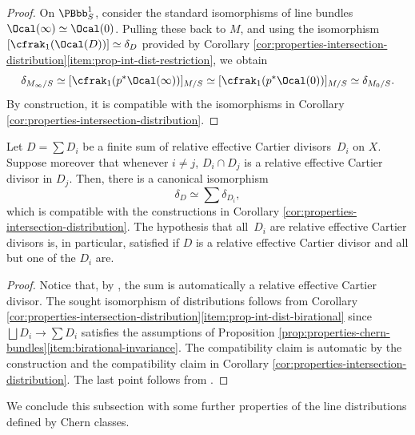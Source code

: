 \begin{proof}
On $\PBbb^{1}_{S}$, consider the standard isomorphisms of line bundles $\Ocal(\infty)\simeq\Ocal(0)$. Pulling these back to $M$, and using the isomorphism $[\cfrak_{1}(\Ocal(D))]\simeq\delta_{D}$ provided by Corollary \ref{cor:properties-intersection-distribution}\eqref{item:prop-int-dist-restriction}, we obtain
\begin{displaymath}
\delta_{M_\infty/S}\simeq [\cfrak_{1}(p^\ast \Ocal(\infty))]_{M/S} \simeq [\cfrak_{1}(p^\ast \Ocal(0))]_{M/S} \simeq \delta_{M_0/S}.
\end{displaymath}
By construction, it is compatible with the isomorphisms in Corollary \ref{cor:properties-intersection-distribution}.
\end{proof}

\begin{corollary}
Let $D = \sum D_i$ be a finite sum of relative effective Cartier divisors~$D_i$ on $X$. Suppose moreover that whenever $i\neq j$, $D_i \cap D_j$ is a relative effective Cartier divisor in $D_j$. Then, there is a canonical isomorphism
\begin{displaymath}
\delta_{D}\simeq \sum \delta_{D_i},
\end{displaymath}
which is compatible with the constructions in Corollary \ref{cor:properties-intersection-distribution}. The hypothesis that all~$D_i$ are relative effective Cartier divisors is, in particular, satisfied if $D$ is a relative effective Cartier divisor and all but one of the $D_i$ are.
\end{corollary}
\begin{proof}
Notice that, by \cite[\href{https://stacks.math.columbia.edu/tag/0B8V}{0B8U}]{stacks-project}, the sum is automatically a relative effective Cartier divisor. The sought isomorphism of distributions follows from Corollary \ref{cor:properties-intersection-distribution}\eqref{item:prop-int-dist-birational} since $\bigsqcup D_i \to \sum D_i$ satisfies the assumptions of Proposition \ref{prop:properties-chern-bundles}\eqref{item:birational-invariance}. The compatibility claim is automatic by the construction and the compatibility claim in Corollary \ref{cor:properties-intersection-distribution}. The last point follows from \cite[\href{https://stacks.math.columbia.edu/tag/0B8V}{0B8V}]{stacks-project}.
\end{proof}

We conclude this subsection with some further properties of the line distributions defined by Chern classes.


